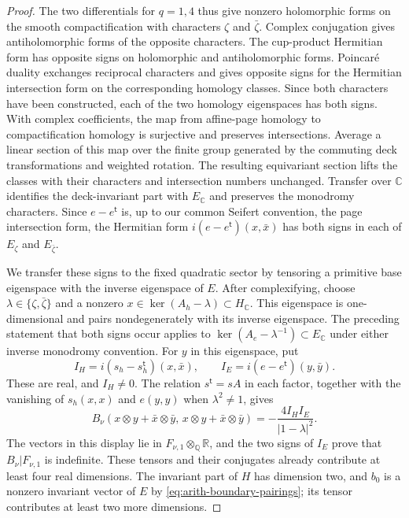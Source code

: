 \begin{proof}
The two differentials for $q=1,4$ thus give nonzero holomorphic
forms on the smooth compactification with characters $\zeta$ and
$\bar\zeta$.  Complex conjugation gives antiholomorphic forms of
the opposite characters.  The cup-product Hermitian form has
opposite signs on holomorphic and antiholomorphic forms. Poincar\'e
duality exchanges reciprocal characters and gives opposite signs for the
Hermitian intersection form on the corresponding homology classes. Since both characters
have been constructed, each of the two homology eigenspaces has both
signs. With complex coefficients, the map from affine-page homology to
compactification homology is surjective and preserves intersections. Average a linear section
of this map over the finite group generated by the commuting deck
transformations and weighted rotation. The resulting equivariant
section lifts the classes with their characters and intersection
numbers unchanged. Transfer over $\mathbb C$ identifies
the deck-invariant part with $E_{\mathbb C}$ and preserves the
monodromy characters.  Since $e-e^{\mathsf t}$ is, up to our common
Seifert convention, the page intersection form, the Hermitian form
$i(e-e^{\mathsf t})(x,\bar x)$ has both signs in each of
$E_\zeta$ and $E_{\bar\zeta}$.

We transfer these signs to the fixed quadratic sector by tensoring
a primitive base eigenspace with the inverse eigenspace of $E$.
After complexifying, choose $\lambda\in\{\zeta,\bar\zeta\}$ and a
nonzero $x\in\ker(A_h-\lambda)\subset H_{\mathbb C}$. This eigenspace is one-dimensional and
pairs nondegenerately with its inverse eigenspace. The preceding
statement that both signs occur applies to
$\ker(A_e-\lambda^{-1})\subset E_{\mathbb C}$
under either inverse monodromy convention. For $y$ in this eigenspace, put
\[
 I_H=i(s_h-s_h^{\mathsf t})(x,\bar x),\qquad
 I_E=i(e-e^{\mathsf t})(y,\bar y).
\]
These are real, and $I_H\ne0$. The relation $s^{\mathsf t}=sA$ in
each factor, together with the vanishing of $s_h(x,x)$ and $e(y,y)$
when $\lambda^2\ne1$, gives
\[
 B_\nu(x\otimes y+\bar x\otimes\bar y,\,
       x\otimes y+\bar x\otimes\bar y)
 =-\frac{4I_HI_E}{|1-\lambda|^2}.
\]
The vectors in this display lie in $F_{\nu,1}\otimes_{\mathbb Q}\mathbb R$, and the two
signs of $I_E$ prove that $B_\nu|F_{\nu,1}$ is indefinite. These
tensors and their conjugates already contribute at least four real dimensions.
The invariant part of $H$ has dimension two, and $b_0$ is a nonzero
invariant vector of $E$ by \eqref{eq:arith-boundary-pairings}; its
tensor contributes at least two more dimensions.


\end{proof}
